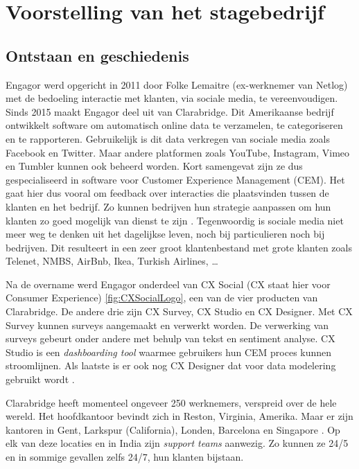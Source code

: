 \chapter{Voorstelling van het stagebedrijf}
\vspace{-3cm}
\section{Ontstaan en geschiedenis}

Engagor werd opgericht in 2011 door Folke Lemaitre (ex-werknemer van Netlog) met de bedoeling interactie met klanten, via sociale media, te vereenvoudigen. Sinds 2015 maakt Engagor deel uit van Clarabridge. Dit Amerikaanse bedrijf ontwikkelt software om automatisch online data te verzamelen, te categoriseren en te rapporteren. Gebruikelijk is dit data verkregen van sociale media zoals Facebook en Twitter. Maar andere platformen zoals YouTube, Instagram, Vimeo en Tumbler kunnen ook beheerd worden. Kort samengevat zijn ze dus gespecialiseerd in software voor Customer Experience Management (CEM). Het gaat hier dus vooral om feedback over interacties die plaatsvinden tussen de klanten en het bedrijf. Zo kunnen bedrijven hun strategie aanpassen om hun klanten zo goed mogelijk van dienst te zijn \cite{bp1}. Tegenwoordig is sociale media niet meer weg te denken uit het dagelijkse leven, noch bij particulieren noch bij bedrijven. Dit resulteert in een zeer groot klantenbestand met grote klanten zoals Telenet, NMBS, AirBnb, Ikea, Turkish Airlines, \ldots 

Na de overname werd Engagor onderdeel van CX Social (CX staat hier voor Consumer Experience) \ref{fig:CXSocialLogo}, een van de vier producten van Clarabridge. De andere drie zijn CX Survey, CX Studio en CX Designer. Met CX Survey kunnen surveys aangemaakt en verwerkt worden. De verwerking van surveys gebeurt onder andere met behulp van tekst en sentiment analyse. CX Studio is een \textit{dashboarding tool} waarmee gebruikers hun CEM proces kunnen stroomlijnen. Als laatste is er ook nog CX Designer dat voor data modelering gebruikt wordt \cite{Clarabridge.com}. 

Clarabridge heeft momenteel ongeveer 250 werknemers, verspreid over de hele wereld. Het hoofdkantoor bevindt zich in Reston, Virginia, Amerika. Maar er zijn kantoren in Gent, Larkspur (California), Londen, Barcelona en Singapore \cite{ClarabridgeOffices}. Op elk van deze locaties en in India zijn \textit{support teams} aanwezig. Zo kunnen ze 24/5 en in sommige gevallen zelfs 24/7, hun klanten bijstaan.


